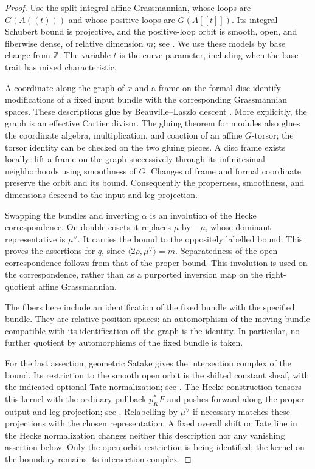 \begin{proof}
Use the split integral affine Grassmannian, whose loops are
$G(A((t)))$ and whose positive loops are $G(A[[t]])$.  Its integral
Schubert bound is projective, and the positive-loop orbit is smooth,
open, and fiberwise dense, of relative dimension $m$; see
\cite[\S\S1.2 and~2.1]{RicharzScholbach}.  We use these models by base change from
$\mathbb Z$.  The variable $t$ is the curve parameter, including when the
base trait has mixed characteristic.

A coordinate along the graph of $x$ and a frame on the formal disc
identify modifications of a fixed input bundle with the corresponding
Grassmannian spaces.  These descriptions glue by
Beauville--Laszlo descent \cite{BeauvilleLaszlo}.  More explicitly, the
graph is an effective Cartier divisor.  The gluing theorem for modules
also glues the coordinate algebra, multiplication, and coaction of an
affine $G$-torsor; the torsor identity can be checked on the two gluing
pieces.  A disc frame exists locally: lift a frame on the graph
successively through its infinitesimal neighborhoods using smoothness of
$G$.  Changes of frame and formal coordinate preserve the orbit and its
bound.  Consequently the properness, smoothness, and dimensions descend
to the input-and-leg projection.

Swapping the bundles and inverting $\alpha$ is an involution of the Hecke
correspondence.  On double cosets it replaces $\mu$ by $-\mu$, whose
dominant representative is $\mu^\vee$.  It carries the bound to the
oppositely labelled bound.  This proves the assertions for $q$, since
$\langle 2\rho,\mu^\vee\rangle=m$.  Separatedness of the open
correspondence follows from that of the proper bound.  This involution
is used on the correspondence, rather than as a purported inversion map
on the right-quotient affine Grassmannian.

The fibers here include an identification of the fixed bundle with the
specified bundle.  They are relative-position spaces: an automorphism
of the moving bundle compatible with its identification off the graph
is the identity.  In particular, no further quotient by automorphisms
of the fixed bundle is taken.

For the last assertion, geometric Satake gives the intersection complex
of the bound.  Its restriction to the smooth open orbit is the shifted
constant sheaf, with the indicated optional Tate normalization; see
\cite[Proposition~4.1]{Richarz}.  The Hecke construction tensors this kernel with the ordinary pullback
$p_K^*F$ and pushes forward along the proper output-and-leg projection;
see \cite[\S\S4.2.1--4.2.4]{GR}.  Relabelling by $\mu^\vee$ if necessary
matches these projections with the chosen representation.  A fixed
overall shift or Tate line in the Hecke normalization changes neither
this description nor any vanishing assertion below.  Only the open-orbit
restriction is being identified; the kernel on the boundary remains its
intersection complex.
\end{proof}

